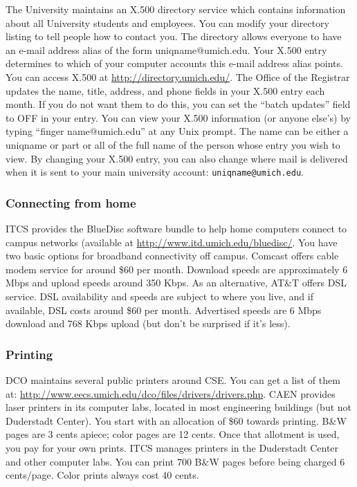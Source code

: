 \documentclass[11pt]{article}
\begin{document}
The University maintains an X.500 directory service which contains information about all University students and employees. You can modify your directory listing to tell people how to contact you.
The directory allows everyone to have an e-mail address alias of the form uniqname@umich.edu. Your X.500 entry determines to which of your computer accounts this e-mail address alias points.  You can access X.500 at \href{http://directory.umich.edu/}{http://directory.umich.edu/}.
The Office of the Registrar updates the name, title, address, and phone fields in your X.500 entry each month. If you do not want them to do this, you can set the “batch updates” field to OFF in your entry.
You can view your X.500 information (or anyone else's) by typing “finger name@umich.edu” at any Unix prompt.  The name can be either a uniqname or part or all of the full name of the person whose entry you wish to view.
By changing your X.500 entry, you can also change where mail is
delivered when it is sent to your main university account:
\texttt{uniqname@umich.edu}.
\subsubsection{Connecting from home}
\label{sec-7_1_7}

ITCS provides the BlueDisc software bundle to help home computers connect to campus networks (available at \href{http://www.itd.umich.edu/bluedisc/}{http://www.itd.umich.edu/bluedisc/}.
You have two basic options for broadband connectivity off campus.
Comcast offers cable modem service for around \$60 per month.  Download
speeds are approximately 6 Mbps and upload speeds around 350 Kbps.  As
an alternative, AT\&T offers DSL service.  DSL availability and speeds
are subject to where you live, and if available, DSL costs around \$60
per month.  Advertised speeds are 6 Mbps download and 768 Kbps upload
(but don’t be surprised if it’s less).
\subsubsection{Printing}
\label{sec-7_1_8}

DCO maintains several public printers around CSE.  You can get a list of them at: \href{http://www.eecs.umich.edu/dco/files/drivers/drivers.php}{http://www.eecs.umich.edu/dco/files/drivers/drivers.php}.
CAEN provides laser printers in its computer labs, located in most engineering buildings (but not Duderstadt Center).  You start with an allocation of \$60 towards printing.  B\&W pages are 3 cents apiece; color pages are 12 cents.  Once that allotment is used, you pay for your own prints.
ITCS manages printers in the Duderstadt Center and other computer
labs.  You can print 700 B\&W pages before being charged 6 cents/page.
Color prints always cost 40 cents.
\end{document}
